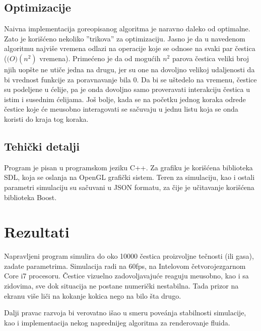 \documentclass[12pt]{article}
\begin{document}
    \subsection{Optimizacije}
        Naivna implementacija goreopisanog algoritma je naravno daleko od optimalne. Zato je kori\v s\'ceno nekoliko ''trikova'' za optimizaciju. Jasno je da u navedenom algoritmu najvi\v se vremena odlazi na operacije koje se odnose na svaki par \v cestica ($\mathcal(O)(n^2)$ vremena). Prime\'ceno je da od mogu\'cih $n^2$ parova \v cestica veliki broj njih uop\v ste ne uti\v ce jedna na drugu, jer su one na dovoljno velikoj udaljenosti da bi vrednost funkcije za poravnavanje bila $0$. Da bi se u\v stedelo na vremenu, \v cestice su podeljene u \'celije, pa je onda dovoljno samo proveravati interakciju \v cestica u istim i susednim \' celijama. Jo\v s bolje, kada se na po\v cetku jednog koraka odrede \v cestice koje \'ce me\dj usobno interagovati se sa\v cuvaju u jednu listu koja se onda koristi do kraja tog koraka.
        
    \subsection{Tehi\v cki detalji}
        Program je pisan u programskom jeziku C++. Za grafiku je kori\v s\'cena biblioteka SDL, koja se oslanja na OpenGL grafi\v cki sistem.
        Teren za simulaciju, kao i ostali parametri simulaciju su sa\v cuvani u JSON formatu, za \v cije je u\v citavanje kori\v s\'cena biblioteka Boost.

    \section{Rezultati}
        Napravljeni program simulira do oko 10000 \v cestica proizvoljne te\v cnosti (ili gasa), zadate parametrima. Simulacija radi na 60fps, na Intelovom \v cetvorojezgarnom Core i7 procesoru. \v Cestice vizuelno zadovoljavaju\'ce reaguju me\dj usobno, kao i sa zidovima, sve dok situacija ne postane numeri\v cki nestabilna. Tada prizor na ekranu vi\v se li\v ci na kokanje kokica nego na bilo \v sta drugo.
        
        Dalji pravac razvoja bi verovatno i\v sao u smeru pove\'anja stabilnosti simulacije, kao i implementacija nekog naprednijeg algoritma za renderovanje fluida.
\newpage


\end{document}
